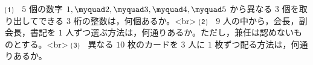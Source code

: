 ⑴　$5$ 個の数字 $1,\myquad 2,\myquad 3,\myquad 4,\myquad 5$ から異なる $3$ 個を取り出してできる $3$ 桁の整数は，何個あるか。<br> 
⑵　$9$ 人の中から，会長，副会長，書記を $1$ 人ずつ選ぶ方法は，何通りあるか。ただし，兼任は認めないものとする。<br>
⑶　異なる $10$ 枚のカードを $3$ 人に $1$ 枚ずつ配る方法は，何通りあるか。